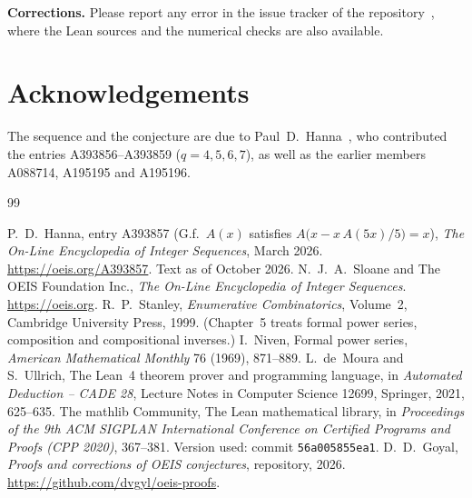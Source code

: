 \documentclass[11pt,a4paper]{article}
\theoremstyle{definition}
\theoremstyle{remark}
\newcommand{\para}[1]{\par\medskip\noindent\textbf{#1}\enspace}
\begin{document}
\para{Corrections.} Please report any error in the issue tracker of the repository~\cite{repo}, where the Lean sources and the numerical checks are also
available.

\section*{Acknowledgements}
The sequence and the conjecture are due to Paul~D.~Hanna~\cite{oeis}, who contributed
the entries A393856--A393859 ($q=4,5,6,7$), as well as the earlier members A088714, A195195 and A195196.

\begin{thebibliography}{99}\small
\raggedright
{} P.~D.~Hanna, entry A393857 (G.f.\ $A(x)$ satisfies $A\bigl(x-x\,A(5x)/5\bigr)=x$), \emph{The On-Line Encyclopedia of Integer Sequences}, March 2026. \url{https://oeis.org/A393857}. Text as of October 2026.
 N.~J.~A.~Sloane and The OEIS Foundation Inc., \emph{The On-Line Encyclopedia of Integer Sequences}. \url{https://oeis.org}.
 R.~P.~Stanley, \emph{Enumerative Combinatorics}, Volume~2, Cambridge University Press, 1999. (Chapter~5 treats formal power series, composition and compositional inverses.)
 I.~Niven, Formal power series, \emph{American Mathematical Monthly} 76 (1969), 871--889.
 L.~de~Moura and S.~Ullrich, The Lean~4 theorem prover and programming language, in \emph{Automated Deduction -- CADE 28}, Lecture Notes in Computer Science 12699, Springer, 2021, 625--635.
 The mathlib Community, The Lean mathematical library, in \emph{Proceedings of the 9th ACM SIGPLAN International Conference on Certified Programs and Proofs (CPP 2020)}, 367--381. Version used: commit \texttt{56a005855ea1}.
 D.~D.~Goyal, \emph{Proofs and corrections of OEIS conjectures}, repository, 2026. \url{https://github.com/dvgyl/oeis-proofs}.
\end{thebibliography}
\end{document}
